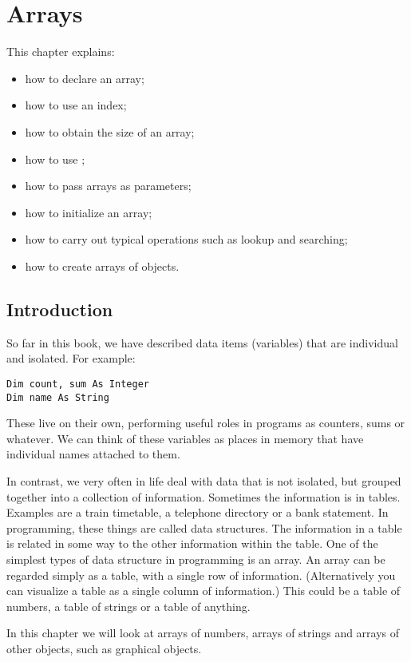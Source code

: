 \chapter{Arrays}
	\label{ch:arrays}

	This chapter explains:
	\begin{itemize}
    \item how to declare an array;
    \item how to use an index;
    \item how to obtain the size of an array;
    \item how to use ;
    \item how to pass arrays as parameters;
    \item how to initialize an array;
    \item how to carry out typical operations such as lookup and searching;
    \item how to create arrays of objects.
	\end{itemize}


  \section{Introduction}
		So far in this book, we have described data items (variables) that are individual and isolated. For example:
		\begin{lstlisting}
Dim count, sum As Integer
Dim name As String
		\end{lstlisting}
		These live on their own, performing useful roles in programs as counters, sums or whatever. We can think of these variables as places in memory that have individual names attached to them.
		
		In contrast, we very often in life deal with data that is not isolated, but grouped together into a collection of information. Sometimes the information is in tables. Examples are a train timetable, a telephone directory or a bank statement. In programming, these things are called data structures. The information in a table is related in some way to the other information within the table. One of the simplest types of data structure in programming is an array. An array can be regarded simply as a table, with a single row of information. (Alternatively you can visualize a table as a single column of information.) This could be a table of numbers, a table of strings or a table of anything.
		
		In this chapter we will look at arrays of numbers, arrays of strings and arrays of other objects, such as graphical objects.
		

